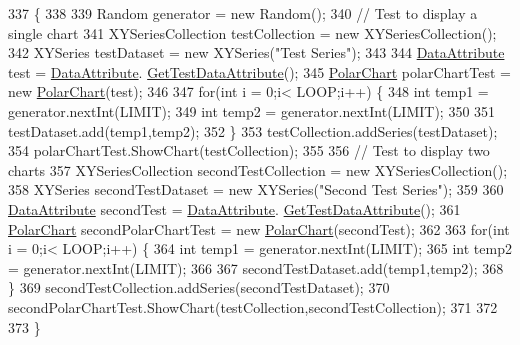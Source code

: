 \begin{DoxyCode}
337                                                  \{
338             
339             Random generator = \textcolor{keyword}{new} Random();
340             \textcolor{comment}{// Test to display a single chart}
341             XYSeriesCollection testCollection = \textcolor{keyword}{new} XYSeriesCollection();
342             XYSeries testDataset = \textcolor{keyword}{new} XYSeries(\textcolor{stringliteral}{"Test Series"});
343             
344             \hyperlink{class_data_attribute}{DataAttribute} test = \hyperlink{class_data_attribute}{DataAttribute}.
      \hyperlink{class_data_attribute_a9c7a1923698c1530fa38c959596199bc}{GetTestDataAttribute}();
345             \hyperlink{class_polar_chart}{PolarChart} polarChartTest = \textcolor{keyword}{new} \hyperlink{class_polar_chart_a5f108692551cb8c74b55fae0138cc2fb}{PolarChart}(test);
346             
347             \textcolor{keywordflow}{for}(\textcolor{keywordtype}{int} i = 0;i< LOOP;i++) \{
348                 \textcolor{keywordtype}{int} temp1 = generator.nextInt(LIMIT);
349                 \textcolor{keywordtype}{int} temp2 = generator.nextInt(LIMIT);
350                 
351                 testDataset.add(temp1,temp2);
352             \}
353             testCollection.addSeries(testDataset);
354             polarChartTest.ShowChart(testCollection);
355             
356             \textcolor{comment}{// Test to display two charts}
357             XYSeriesCollection secondTestCollection = \textcolor{keyword}{new} XYSeriesCollection();
358             XYSeries secondTestDataset = \textcolor{keyword}{new} XYSeries(\textcolor{stringliteral}{"Second Test Series"});
359             
360             \hyperlink{class_data_attribute}{DataAttribute} secondTest = \hyperlink{class_data_attribute}{DataAttribute}.
      \hyperlink{class_data_attribute_a9c7a1923698c1530fa38c959596199bc}{GetTestDataAttribute}();
361             \hyperlink{class_polar_chart}{PolarChart} secondPolarChartTest = \textcolor{keyword}{new} \hyperlink{class_polar_chart_a5f108692551cb8c74b55fae0138cc2fb}{PolarChart}(secondTest);
362             
363             \textcolor{keywordflow}{for}(\textcolor{keywordtype}{int} i = 0;i< LOOP;i++) \{
364                 \textcolor{keywordtype}{int} temp1 = generator.nextInt(LIMIT);
365                 \textcolor{keywordtype}{int} temp2 = generator.nextInt(LIMIT);
366                 
367                 secondTestDataset.add(temp1,temp2);
368             \}
369             secondTestCollection.addSeries(secondTestDataset);
370             secondPolarChartTest.ShowChart(testCollection,secondTestCollection);
371         
372         
373         \}
\end{DoxyCode}
